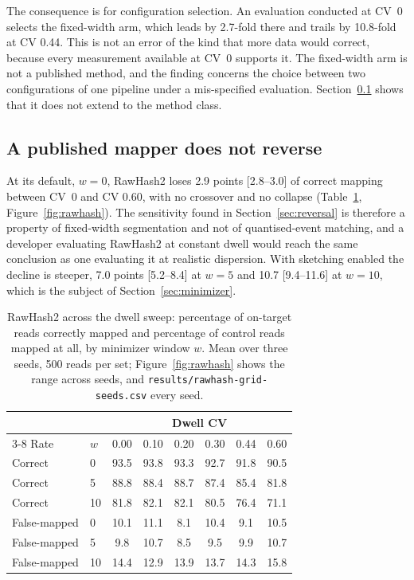 \documentclass[11pt,a4paper]{article}
\begin{document}
The consequence is for configuration selection. An evaluation conducted at CV~0 selects the
fixed-width arm, which leads by 2.7-fold there and trails by 10.8-fold at CV 0.44. This is not an
error of the kind that more data would correct, because every measurement available at CV~0
supports it. The fixed-width arm is not a published method, and the finding concerns the choice
between two configurations of one pipeline under a mis-specified evaluation.
Section~\ref{sec:bound} shows that it does not extend to the method class.

\subsection{A published mapper does not reverse}\label{sec:bound}

At its default, $w = 0$, RawHash2 loses 2.9 points [2.8--3.0] of correct mapping between CV~0 and
CV 0.60, with no crossover and no collapse (Table~\ref{tab:rawhash}, Figure~\ref{fig:rawhash}). The
sensitivity found in Section~\ref{sec:reversal} is therefore a property of fixed-width segmentation
and not of quantised-event matching, and a developer evaluating RawHash2 at constant dwell would
reach the same conclusion as one evaluating it at realistic dispersion. With sketching enabled the
decline is steeper, 7.0 points [5.2--8.4] at $w = 5$ and 10.7 [9.4--11.6] at $w = 10$, which is the
subject of Section~\ref{sec:minimizer}.

\begin{table}[t]
\centering
\caption{RawHash2 across the dwell sweep: percentage of on-target reads correctly mapped and
percentage of control reads mapped at all, by minimizer window $w$. Mean over three seeds, 500
reads per set; Figure~\ref{fig:rawhash} shows the range across seeds, and
\texttt{results/rawhash-grid-seeds.csv} every seed.}
\label{tab:rawhash}
\begin{tabular}{llcccccc}
\toprule
 & & \multicolumn{6}{c}{Dwell CV} \\
\cmidrule(lr){3-8}
Rate & $w$ & 0.00 & 0.10 & 0.20 & 0.30 & 0.44 & 0.60 \\
\midrule
Correct & 0 & 93.5 & 93.8 & 93.3 & 92.7 & 91.8 & 90.5 \\
Correct & 5 & 88.8 & 88.4 & 88.7 & 87.4 & 85.4 & 81.8 \\
Correct & 10 & 81.8 & 82.1 & 82.1 & 80.5 & 76.4 & 71.1 \\
\midrule
False-mapped & 0 & 10.1 & 11.1 & 8.1 & 10.4 & 9.1 & 10.5 \\
False-mapped & 5 & 9.8 & 10.7 & 8.5 & 9.5 & 9.9 & 10.7 \\
False-mapped & 10 & 14.4 & 12.9 & 13.9 & 13.7 & 14.3 & 15.8 \\
\bottomrule
\end{tabular}
\end{table}
\end{document}

